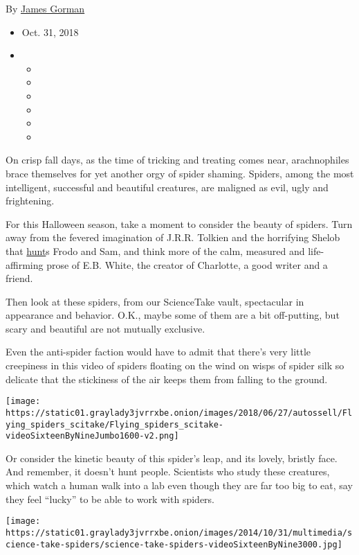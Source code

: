 By \href{https://www.nytimes3xbfgragh.onion/by/james-gorman}{James
Gorman}

\begin{itemize}
\item
  Oct. 31, 2018
\item
  \begin{itemize}
  \item
  \item
  \item
  \item
  \item
  \item
  \end{itemize}
\end{itemize}

On crisp fall days, as the time of tricking and treating comes near,
arachnophiles brace themselves for yet another orgy of spider shaming.
Spiders, among the most intelligent, successful and beautiful creatures,
are maligned as evil, ugly and frightening.

For this Halloween season, take a moment to consider the beauty of
spiders. Turn away from the fevered imagination of J.R.R. Tolkien and
the horrifying Shelob that
\href{http://lotr.wikia.com/wiki/Shelob}{hunt}s Frodo and Sam, and think
more of the calm, measured and life-affirming prose of E.B. White, the
creator of Charlotte, a good writer and a friend.

Then look at these spiders, from our ScienceTake vault, spectacular in
appearance and behavior. O.K., maybe some of them are a bit off-putting,
but scary and beautiful are not mutually exclusive.

Even the anti-spider faction would have to admit that there's very
little creepiness in this video of spiders floating on the wind on wisps
of spider silk so delicate that the stickiness of the air keeps them
from falling to the ground.

\texttt{[image: https://static01.graylady3jvrrxbe.onion/images/2018/06/27/autossell/Flying\_spiders\_scitake/Flying\_spiders\_scitake-videoSixteenByNineJumbo1600-v2.png]}

Or consider the kinetic beauty of this spider's leap, and its lovely,
bristly face. And remember, it doesn't hunt people. Scientists who study
these creatures, which watch a human walk into a lab even though they
are far too big to eat, say they feel ``lucky'' to be able to work with
spiders.

\texttt{[image: https://static01.graylady3jvrrxbe.onion/images/2014/10/31/multimedia/science-take-spiders/science-take-spiders-videoSixteenByNine3000.jpg]}


